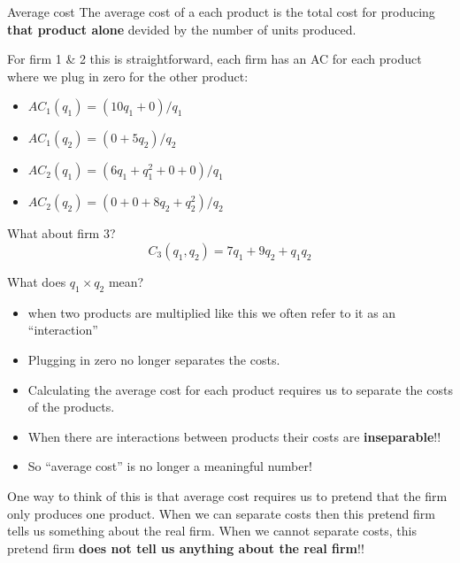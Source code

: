 \documentclass[
  ignorenonframetext,
]{beamer}
\providecommand{\tightlist}{%
  \setlength{\itemsep}{0pt}\setlength{\parskip}{0pt}}\usepackage{longtable,booktabs,array}
\begin{document}
\begin{frame}{Average cost}
\label{average-cost}
The average cost of a each product is the total cost for producing
\textbf{that product alone} devided by the number of units produced.

\pause

For firm 1 \& 2 this is straightforward, each firm has an AC for each
product where we plug in zero for the other product:

\pause

\begin{itemize}
\tightlist
\item
  \(AC_1(q_1) = (10q_1 + 0)/q_1\)
\item
  \(AC_1(q_2) = (0 + 5q_2)/q_2\)
\end{itemize}

\pause

\begin{itemize}
\tightlist
\item
  \(AC_2(q_1) = (6q_1 + q_1^2 + 0 + 0)/q_1\)
\item
  \(AC_2(q_2) = (0 + 0 + 8q_2 + q_2^2)/q_2\)
\end{itemize}
\end{frame}

\begin{frame}
\begin{block}{What about firm 3?}
\label{what-about-firm-3}
\[C_3(q_1, q_2) = 7q_1 + 9q_2 + q_1q_2\]

\pause
\end{block}

\begin{block}{What does \(q_1\times q_2\) mean?}
\label{what-does-q_1times-q_2-mean}
\begin{itemize}
\tightlist
\item
  when two products are multiplied like this we often refer to it as an
  ``interaction''
\item
  Plugging in zero no longer separates the costs.
\end{itemize}

\pause

\begin{itemize}
\tightlist
\item
  Calculating the average cost for each product requires us to separate
  the costs of the products.
\item
  When there are interactions between products their costs are
  \textbf{inseparable}!!
\item
  So ``average cost'' is no longer a meaningful number!
\end{itemize}

\pause

One way to think of this is that average cost requires us to pretend
that the firm only produces one product. When we can separate costs then
this pretend firm tells us something about the real firm. When we cannot
separate costs, this pretend firm \textbf{does not tell us anything
about the real firm}!!
\end{block}
\end{frame}
\end{document}
